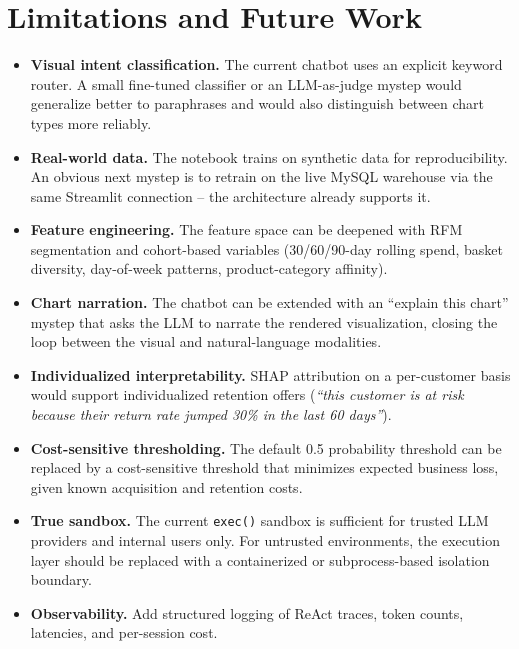 \documentclass[11pt,a4paper]{article}
\begin{document}
\section{Limitations and Future Work}
\label{sec:limitations}

\begin{itemize}
  \item \textbf{Visual intent classification.} The current chatbot
        uses an explicit keyword router. A small fine-tuned classifier
        or an LLM-as-judge mystep would generalize better to paraphrases
        and would also distinguish between chart types more reliably.
  \item \textbf{Real-world data.} The notebook trains on synthetic
        data for reproducibility. An obvious next mystep is to retrain
        on the live MySQL warehouse via the same Streamlit connection
        -- the architecture already supports it.
  \item \textbf{Feature engineering.} The feature space can be
        deepened with RFM segmentation and cohort-based variables
        (30/60/90-day rolling spend, basket diversity, day-of-week
        patterns, product-category affinity).
  \item \textbf{Chart narration.} The chatbot can be extended with an
        ``explain this chart'' mystep that asks the LLM to narrate the
        rendered visualization, closing the loop between the visual
        and natural-language modalities.
  \item \textbf{Individualized interpretability.} SHAP attribution
        \cite{lundberg2017unified} on a per-customer basis would
        support individualized retention offers (\textit{``this
        customer is at risk because their return rate jumped 30\% in
        the last 60 days''}).
  \item \textbf{Cost-sensitive thresholding.} The default 0.5
        probability threshold can be replaced by a cost-sensitive
        threshold that minimizes expected business loss, given known
        acquisition and retention costs.
  \item \textbf{True sandbox.} The current \texttt{exec()} sandbox is
        sufficient for trusted LLM providers and internal users only.
        For untrusted environments, the execution layer should be
        replaced with a containerized or subprocess-based isolation
        boundary.
  \item \textbf{Observability.} Add structured logging of ReAct
        traces, token counts, latencies, and per-session cost.
\end{itemize}
\end{document}

